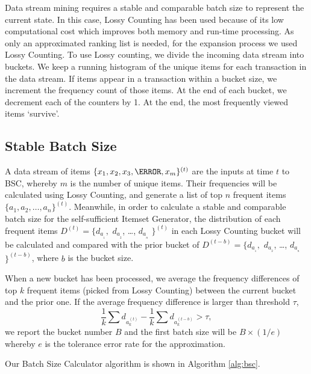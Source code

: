 Data stream mining requires a stable and comparable batch size to represent the current state. In this case, Lossy Counting \cite{lossy} has been used because of its low computational cost which improves both memory and run-time processing. As only an approximated ranking list is needed, for the expansion process we used Lossy Counting. To use Lossy counting, we divide the incoming data stream into buckets. We keep a running histogram of the unique items for each transaction in the data stream. If items appear in a transaction within a bucket size, we increment the frequency count of those items. At the end of each bucket, we decrement each of the counters by 1. At the end, the most frequently viewed items `survive'.


\subsection{Stable Batch Size}

A data stream of items $\{x_1, x_2, x_3, \C, x_m\}^{(t)}$ are the inputs at time $t$ to BSC, whereby $m$ is the number of unique items. Their frequencies will be calculated using Lossy Counting, and generate a list of top $n$ frequent items $\{a_1, a_2, \ldots, a_n\}^{(t)}$. Meanwhile, in order to calculate a stable and comparable batch size for the self-sufficient Itemset Generator, the distribution of each frequent items $D^{(t)} = \{d_a__1,$ $d_a__2$, \ldots, $d_a__n$ $\}^{(t)}$ in each Lossy Counting bucket will be calculated and compared with the prior bucket of $D^{(t-b)}= \{d_a__1,$ $ d_a__2$, \ldots, $d_a__n$ $\}^{(t-b)}$, where $b$ is the bucket size. 

When a new bucket has been processed, we average the frequency differences of top $k$ frequent items (picked from Lossy Counting) between the current bucket and the prior one. If the average frequency difference is larger than threshold $\tau$, 
\[
\frac{1}{k}\sum d_a_k^{(t)} - \frac{1}{k}\sum d_a_k^{(t-b)} > \tau,
\]   
we report the bucket number $B$ and the first batch size will be $B \times (1/e)$ whereby $e$ is the tolerance error rate for the approximation.

Our Batch Size Calculator algorithm is shown in Algorithm \ref{alg:bsc}.

